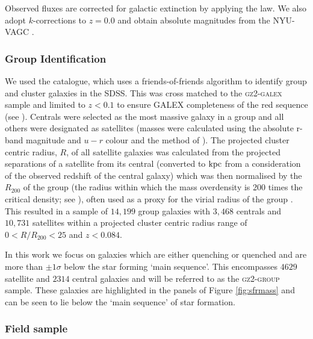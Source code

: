 \documentclass[useAMS,usenatbib]{mn2e}
\begin{document}
Observed fluxes are corrected for galactic extinction \citep{Oh11} by applying the \citet{cardelli89} law. We also adopt $k$-corrections to $z = 0.0$ and obtain absolute magnitudes from the NYU-VAGC \citep{blanton05, blanton07, padmanabhan08}.


\subsubsection{Group Identification}\label{sec:groups}

We used the \citet{berlind06} catalogue, which uses a friends-of-friends algorithm to identify group and cluster galaxies in the SDSS. This was cross matched to the \textsc{gz2-galex} sample and limited to $z < 0.1$ to ensure GALEX completeness of the red sequence (see \citealt{wyder07, yesuf14}). Centrals were selected as the most massive galaxy in a group and all others were designated as satellites (masses were calculated using the absolute r-band magnitude and $u-r$ colour and the method of \citealt{baldry06}).  The projected cluster centric radius, $R$, of all satellite galaxies was calculated from the projected separations of a satellite from its central (converted to $\rm{kpc}$ from a consideration of the observed redshift of the central galaxy) which was then normalised by the $R_{200}$ of the group (the radius within which the mass overdensity is 200 times the critical density; see \citealt{finn05}), often used as a proxy for the virial radius of the group \citep{navarro95}. This resulted in a sample of $14,199$ group galaxies with $3,468$ centrals and $10,731$ satellites within a projected cluster centric radius range of $0 < R/R_{200} < 25$ and $z < 0.084$. 

In this work we focus on galaxies which are either quenching or quenched and are more than $\pm1\sigma$ below the star forming `main sequence'. This encompasses $4629$ satellite and $2314$ central galaxies and will be referred to as the \textsc{gz2-group} sample. These galaxies are highlighted in the panels of Figure \ref{fig:sfrmass} and can be seen to lie below the `main sequence' of star formation. 

\subsubsection{Field sample}\label{sec:field}
\end{document}
